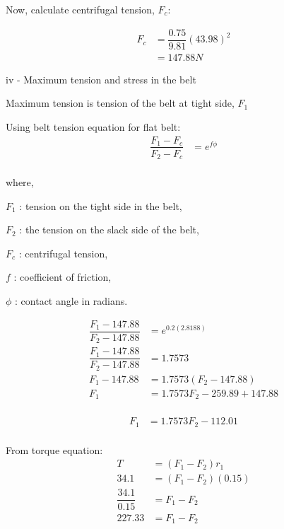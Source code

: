 \documentclass[a4paper, fleqn]{article}
\begin{document}
Now, calculate centrifugal tension, $F_c$:

\begin{equation*}
    \begin{aligned}
    F_c &= \dfrac{0.75}{9.81} (43.98)^2\\
    &= 147.88 N
    \end{aligned}
\end{equation*}

iv - Maximum tension and stress in the belt

Maximum tension is tension of the belt at tight side, $F_1$

Using belt tension equation for flat belt:
\begin{equation*}
    \begin{aligned}
    \dfrac{F_1-F_c}{F_2-F_c} &= e^{f \phi}\\
    \end{aligned}
\end{equation*}

where, 

$F_1$ : tension on the tight side in the belt, 

$F_2$ : the tension on the slack side of the belt,

$F_c$ : centrifugal tension, 

$f$ : coefficient of friction, 

$\phi$ : contact angle in radians.

\begin{equation*}
    \begin{aligned}
    \dfrac{F_1-147.88}{F_2-147.88} &= e^{0.2(2.8188)}\\
    \dfrac{F_1-147.88}{F_2-147.88} &= 1.7573\\
    F_1 - 147.88 &= 1.7573 (F_2 - 147.88)\\
    F_1 &= 1.7573 F_2 - 259.89 + 147.88\\
    \end{aligned}
\end{equation*}

\begin{equation}
    \begin{aligned}
    F_1 &= 1.7573 F_2 - 112.01\\
    \end{aligned}
    \label{eq1}
\end{equation}

From torque equation:
\begin{equation*}
    \begin{aligned}
    T &= (F_1 - F_2) r_1\\
    34.1 &= (F_1 - F_2) (0.15)\\
    \dfrac{34.1}{0.15}  &= F_1 - F_2\\
    227.33  &= F_1 - F_2\\
    \end{aligned}
\end{equation*}
\end{document}
